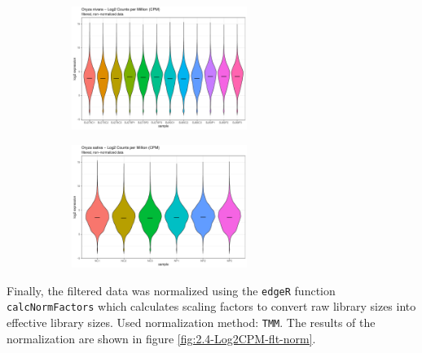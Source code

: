 \begin{figure}[htbp]
    \caption{Log2(CPM) distribution of the filtered (\(< 1\) CPM in at least half of the samples), non-normalized data}
    \label{fig:2.3-Log2CPM-flt-notnorm}
    \begin{subfigure}[t]{0.64\linewidth}
        \label{fig:2.3-Log2CPM-flt-notnorm-Oryza_nivara}
        \includegraphics[width=\textwidth, height=4cm]{../../results/plots-and-tables/2.3-Log2CPM-flt-notnorm-Oryza_nivara}
    \end{subfigure}
    \begin{subfigure}[t]{0.32\linewidth}
        \label{fig:2.3-Log2CPM-flt-notnorm-Oryza_sativa}
        \includegraphics[width=\textwidth, height=4cm]{../../results/plots-and-tables/2.3-Log2CPM-flt-notnorm-Oryza_sativa}
    \end{subfigure}
\end{figure}

Finally, the filtered data was normalized using the \verb|edgeR| function \verb|calcNormFactors| which calculates scaling factors to convert raw library sizes into effective library sizes. Used normalization method: \verb|TMM|. The results of the normalization are shown in figure \ref{fig:2.4-Log2CPM-flt-norm}.

